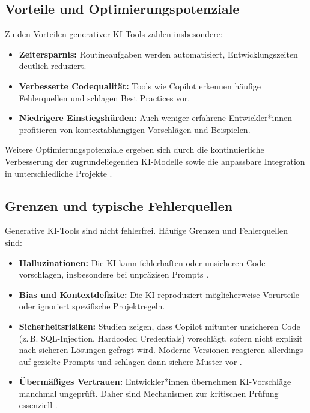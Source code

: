 \subsection{Vorteile und Optimierungspotenziale}

Zu den Vorteilen generativer KI-Tools zählen insbesondere:
\begin{itemize}
    \item \textbf{Zeitersparnis:} Routineaufgaben werden automatisiert, Entwicklungszeiten deutlich reduziert.
    \item \textbf{Verbesserte Codequalität:} Tools wie Copilot erkennen häufige Fehlerquellen und schlagen Best Practices vor.
    \item \textbf{Niedrigere Einstiegshürden:} Auch weniger erfahrene Entwickler*innen profitieren von kontextabhängigen Vorschlägen und Beispielen.
\end{itemize}
Weitere Optimierungspotenziale ergeben sich durch die kontinuierliche Verbesserung der zugrundeliegenden KI-Modelle sowie die anpassbare Integration in unterschiedliche Projekte \cite{kerr_github_nodate,weisz_design_2024}.

\subsection{Grenzen und typische Fehlerquellen}

Generative KI-Tools sind nicht fehlerfrei. Häufige Grenzen und Fehlerquellen
sind:
\begin{itemize}
    \item \textbf{Halluzinationen:} Die KI kann fehlerhaften oder unsicheren Code vorschlagen, insbesondere bei unpräzisen Prompts \cite{shi_ai-assisted_2023}.
    \item \textbf{Bias und Kontextdefizite:} Die KI reproduziert möglicherweise Vorurteile oder ignoriert spezifische Projektregeln.
    \item \textbf{Sicherheitsrisiken:} Studien zeigen, dass Copilot mitunter unsicheren Code (z.\,B. SQL-Injection, Hardcoded Credentials) vorschlägt, sofern nicht explizit nach sicheren Lösungen gefragt wird. Moderne Versionen reagieren allerdings auf gezielte Prompts und schlagen dann sichere Muster vor \cite{shi_ai-assisted_2023}.
    \item \textbf{Übermäßiges Vertrauen:} Entwickler*innen übernehmen KI-Vorschläge manchmal ungeprüft. Daher sind Mechanismen zur kritischen Prüfung essenziell \cite{weisz_design_2024}.
\end{itemize}

